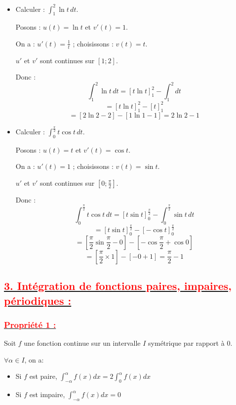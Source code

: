 \documentclass[12pt,a4paper]{article}
\begin{document}
\begin{itemize}
    \item Calculer : \( \int_1^2 \ln t \, dt \).
    
    Posons : \( u(t) = \ln t \) et \( v'(t) = 1 \).
    
    On a : \( u'(t) = \frac{1}{t} \) ; choisissons : \( v(t) = t \).
    
    \( u' \) et \( v' \) sont continues sur \( [1 ; 2] \).
    
    Donc :
    \[
    \int_1^2 \ln t \, dt = \left[ t \ln t \right]_1^2 - \int_1^2 dt
    \]
    \[
    = \left[ t \ln t \right]_1^2 - \left[ t \right]_1^2
    \]
    \[
    = \left[ 2 \ln 2 - 2 \right] - \left[ 1 \ln 1 - 1 \right] = 2 \ln 2 - 1
    \]
    
    \item Calculer : \( \int_0^{\frac{\pi}{2}} t \cos t \, dt \).
    
    Posons : \( u(t) = t \) et \( v'(t) = \cos t \).
    
    On a : \( u'(t) = 1 \) ; choisissons : \( v(t) = \sin t \).
    
    \( u' \) et \( v' \) sont continues sur \( [0 ; \frac{\pi}{2}] \).
    
    Donc :
    \[
    \int_0^{\frac{\pi}{2}} t \cos t \, dt = \left[ t \sin t \right]_0^{\frac{\pi}{2}} - \int_0^{\frac{\pi}{2}} \sin t \, dt
    \]
    \[
    = \left[ t \sin t \right]_0^{\frac{\pi}{2}} - \left[ - \cos t \right]_0^{\frac{\pi}{2}}
    \]
    \[
    = \left[ \frac{\pi}{2} \sin \frac{\pi}{2} - 0 \right] - \left[ - \cos \frac{\pi}{2} + \cos 0 \right]
    \]
    \[
    = \left[ \frac{\pi}{2} \times 1 \right] - \left[ - 0 + 1 \right] = \frac{\pi}{2} - 1
    \]
\end{itemize}
\subsection*{\underline{\textbf{\textcolor{red}{3. Intégration de fonctions paires, impaires, périodiques : }}}}
\subsubsection*{\underline{\textcolor{red}{Propriété 1 :}}}
Soit \(f\) une fonction continue sur un intervalle \(I\) symétrique par rapport à \(0\).

\( \forall \alpha \in I \), on a:

\begin{itemize}
    \item Si \(f\) est paire, \( \int_{-\alpha}^{\alpha}f(x)dx = 2 \int_{0}^{\alpha}f(x)dx \)
    \item Si \(f\) est impaire, \( \int_{-\alpha}^{\alpha}f(x)dx =  0 \)
\end{itemize}
\end{document}
